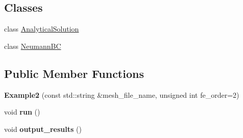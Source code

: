 \subsection*{Classes}
\begin{DoxyCompactItemize}
\item 
class \hyperlink{classLaplaceBEM_1_1Erichsen1996Efficient_1_1Example2_1_1AnalyticalSolution}{Analytical\+Solution}
\item 
class \hyperlink{classLaplaceBEM_1_1Erichsen1996Efficient_1_1Example2_1_1NeumannBC}{Neumann\+BC}
\end{DoxyCompactItemize}
\subsection*{Public Member Functions}
\begin{DoxyCompactItemize}
\item 
\mbox{\label{classLaplaceBEM_1_1Erichsen1996Efficient_1_1Example2_a174f958f5992499c541677385d3fd43b}} 
{\bfseries Example2} (const std\+::string \&mesh\+\_\+file\+\_\+name, unsigned int fe\+\_\+order=2)
\item 
\mbox{\label{classLaplaceBEM_1_1Erichsen1996Efficient_1_1Example2_a05c16fcb30b3c88360ebd13a0e046c9e}} 
void {\bfseries run} ()
\item 
\mbox{\label{classLaplaceBEM_1_1Erichsen1996Efficient_1_1Example2_a77575ff8da117097f342daa9e949f9e5}} 
void {\bfseries output\+\_\+results} ()
\end{DoxyCompactItemize}

